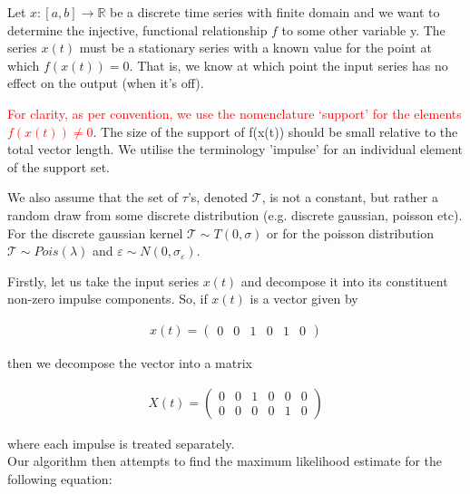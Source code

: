 \documentclass[11pt]{amsart}
\begin{document}
Let $x: [a, b] \longrightarrow \mathbb{R}$ be a discrete time series with finite domain and we want to determine the injective, functional relationship $f$ to some other variable y. The series $x(t)$ must be a stationary series with a known value for the point at which $f(x(t)) = 0$.  That is, we know at which point the input series has no effect on the output (when it’s off). 

\textcolor{red}{For clarity, as per convention, we use the nomenclature ‘support’ for the elements $f(x(t)) \neq 0$}. The size of the support of f(x(t)) should be small relative to the total vector length. We utilise the terminology 'impulse' for an individual element of the support set.

We also assume that the set of $\tau$'s, denoted $\mathcal{T}$, is not a constant, but rather a random draw from some discrete distribution (e.g. discrete gaussian, poisson etc). For the discrete gaussian kernel $\mathcal{T}\sim T(0, \sigma)$ or for the poisson distribution $\mathcal{T}\sim Pois(\lambda)$ and $\varepsilon \sim N(0, \sigma_{\varepsilon})$. 

Firstly, let us take the input series $x(t)$ and decompose it into its constituent non-zero impulse components. So, if $x(t)$ is a vector given by 

\begin{align}
x(t) = 
\left(
\begin{array}{cccccc}
0 & 0 & 1 & 0 & 1 & 0
\end{array}  
\right)
\end{align}

then we decompose the vector into a matrix 

\begin{align}
X(t) = 
\left(
\begin{array}{cccccc}
0 & 0 & 1 & 0 & 0 & 0 \\
0 & 0 & 0 & 0 & 1 & 0 
\end{array}  
\right)
\end{align}

where each impulse is treated separately. \\

Our algorithm then attempts to find the maximum likelihood estimate for the following equation:
\end{document}
